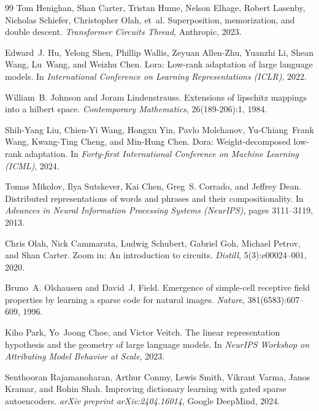 \documentclass[10pt,twocolumn,letterpaper]{article}
\begin{document}
\begin{thebibliography}{99}
Tom Henighan, Shan Carter, Tristan Hume, Nelson Elhage, Robert Lasenby, Nicholas Schiefer, Christopher Olah, et~al.
\newblock Superposition, memorization, and double descent.
\newblock \emph{Transformer Circuits Thread}, Anthropic, 2023.

Edward~J. Hu, Yelong Shen, Phillip Wallis, Zeyuan Allen-Zhu, Yuanzhi Li, Shean Wang, Lu~Wang, and Weizhu Chen.
\newblock Lora: Low-rank adaptation of large language models.
\newblock In \emph{International Conference on Learning Representations (ICLR)}, 2022.

William~B. Johnson and Joram Lindenstrauss.
\newblock Extensions of lipschitz mappings into a hilbert space.
\newblock \emph{Contemporary Mathematics}, 26(189-206):1, 1984.

Shih-Yang Liu, Chien-Yi Wang, Hongxu Yin, Pavlo Molchanov, Yu-Chiang~Frank Wang, Kwang-Ting Cheng, and Min-Hung Chen.
\newblock Dora: Weight-decomposed low-rank adaptation.
\newblock In \emph{Forty-first International Conference on Machine Learning (ICML)}, 2024.

Tomas Mikolov, Ilya Sutskever, Kai Chen, Greg~S. Corrado, and Jeffrey Dean.
\newblock Distributed representations of words and phrases and their compositionality.
\newblock In \emph{Advances in Neural Information Processing Systems (NeurIPS)}, pages 3111--3119, 2013.

Chris Olah, Nick Cammarata, Ludwig Schubert, Gabriel Goh, Michael Petrov, and Shan Carter.
\newblock Zoom in: An introduction to circuits.
\newblock \emph{Distill}, 5(3):e00024--001, 2020.

Bruno~A. Olshausen and David~J. Field.
\newblock Emergence of simple-cell receptive field properties by learning a sparse code for natural images.
\newblock \emph{Nature}, 381(6583):607--609, 1996.

Kiho Park, Yo~Joong Choe, and Victor Veitch.
\newblock The linear representation hypothesis and the geometry of large language models.
\newblock In \emph{NeurIPS Workshop on Attributing Model Behavior at Scale}, 2023.

Senthooran Rajamanoharan, Arthur Conmy, Lewis Smith, Vikrant Varma, Janos Kramar, and Rohin Shah.
\newblock Improving dictionary learning with gated sparse autoencoders.
\newblock \emph{arXiv preprint arXiv:2404.16014}, Google DeepMind, 2024.


\end{thebibliography}
\end{document}
